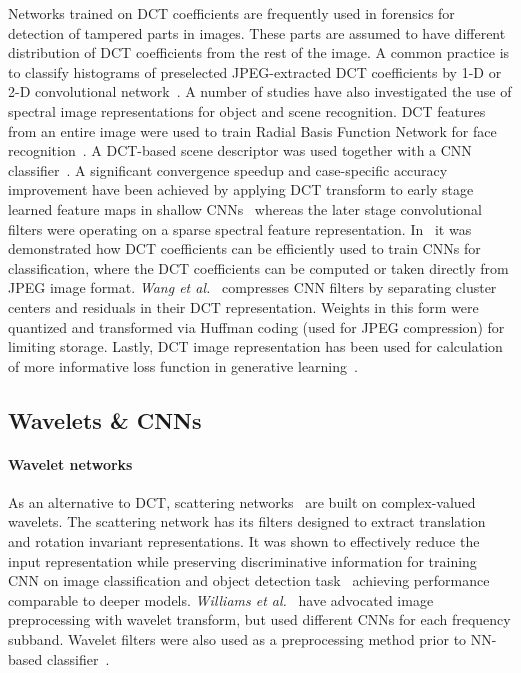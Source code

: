 \documentclass[12pt,a4paper]{article}
\begin{document}
Networks trained on DCT coefficients are frequently used in forensics for detection of tampered parts in images. These parts are assumed to have different distribution of DCT coefficients from the rest of the image.
A common practice is to classify histograms of preselected JPEG-extracted DCT coefficients by 1-D or 2-D convolutional network~\cite{Zheng19}.
A number of studies have also investigated the use of spectral image representations for object and scene recognition. 
DCT features from an entire image were used to train Radial Basis Function Network for face recognition~\cite{Er05}. 
A DCT-based scene descriptor was used together with a CNN classifier~\cite{Farinella15}.
A significant convergence speedup and case-specific accuracy improvement have been achieved by applying DCT transform to early stage learned feature maps in shallow CNNs~\cite{Ghosh16} whereas the later stage convolutional filters were operating on a sparse spectral feature  representation. 
In~\cite{Ulicny17,Gueguen18} it was demonstrated how DCT coefficients can be efficiently used to train CNNs for classification, where the DCT coefficients can be computed or taken directly from JPEG image format. 
\textit{Wang et al.}~\cite{Wang16b} compresses CNN filters by separating cluster centers and residuals in their DCT representation. Weights in this form were quantized and transformed via Huffman coding (used for JPEG compression) for limiting storage. Lastly, DCT image representation has been used for calculation of more informative loss function in generative learning~\cite{Atapour19}. 
\subsection{ Wavelets \& CNNs}

\paragraph{Wavelet networks} 
As an alternative to DCT, scattering networks~\cite{Bruna13} are built on complex-valued wavelets.
The scattering network has its filters designed to extract translation and rotation invariant representations.
It was shown to effectively reduce the input representation while preserving discriminative information for training CNN on image classification and object detection task~\cite{Oyallon18b} achieving performance comparable to deeper models. \textit{Williams et al.}~\cite{Williams16} have advocated image preprocessing with wavelet transform, but used different CNNs for each frequency subband. Wavelet filters were also used as a preprocessing method prior to NN-based classifier~\cite{Said16}.
\end{document}

